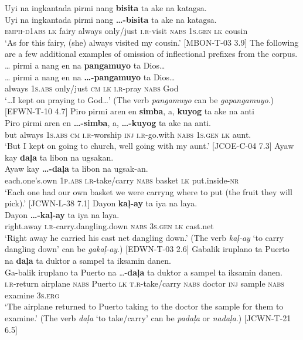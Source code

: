 Uyi  na  ingkantada  pirmi  nang  \textbf{bisita}  ta  ake  na  katagsa. \\\smallskip
 \gll Uyi  na  ingkantada  pirmi  nang  \textbf{…-bisita}  ta  ake  na  katagsa. \\
\textsc{emph}-\textsc{d}1\textsc{abs}  \textsc{lk}  fairy  always  only/just  \textsc{i.r}-visit  \textsc{nabs}  1\textsc{s.gen}  \textsc{lk}  cousin \\
\glt ‘As for this fairy, (she) always visited my cousin.’ [MBON-T-03 3.9]
\z
The following are a few additional examples of omission of inflectional prefixes from the corpus.
\ea
 … pirmi  a  nang  en  na  \textbf{pangamuyo}  ta  Dios… \\\smallskip
 \gll … pirmi  a  nang  en  na  \textbf{…-pangamuyo}  ta  Dios… \\
  {} always  1\textsc{s.abs}  only/just  \textsc{cm}  \textsc{lk}  \textsc{i.r}-pray  \textsc{nabs}  God \\
\glt ‘…I kept on praying to God…’ (The verb \textit{pangamuyo} can be \textit{gapangamuyo}.) [EFWN-T-10 4.7]
\z
\ea
Piro  pirmi  aren  en  \textbf{simba},  a,  \textbf{kuyog}  ta  ake  na  anti \\\smallskip
 \gll Piro  pirmi  aren  en  \textbf{…-simba},  a,  \textbf{…-kuyog}  ta  ake  na  anti. \\
but  always  1\textsc{s.abs}  \textsc{cm}  \textsc{i.r}-worship  \textsc{inj}  \textsc{i.r}-go.with  \textsc{nabs}  1\textsc{s.gen}  \textsc{lk}  aunt. \\
\glt `But I kept on going to church, well going with my aunt.’ [JCOE-C-04 7.3]
\z
\ea
Ayaw  kay  \textbf{daļa}  ta  libon  na  ugsakan. \\\smallskip
 \gll Ayaw  kay  \textbf{…-daļa}  ta  libon  na  ugsak-an. \\
each.one’s.own  1\textsc{p.abs}  \textsc{i.r}-take/carry  \textsc{nabs}  basket  \textsc{lk}  put.inside-\textsc{nr} \\
\glt ‘Each one had our own basket we were carryng where to put (the fruit they will pick).’ [JCWN-L-38 7.1]
\z
\ea
Dayon  \textbf{kaļ-ay}  ta  iya  na  laya. \\\smallskip
 \gll Dayon  \textbf{…-kaļ-ay}  ta  iya  na  laya. \\
right.away  \textsc{i.r}-carry.dangling.down  \textsc{nabs}  3\textsc{s.gen}  \textsc{lk}  cast.net \\
\glt ‘Right away he carried his cast net dangling down.' (The verb \textit{kaļ-ay} ‘to carry dangling down’ can be \textit{gakaļ-ay}.) [EDWN-T-03 2.6]
\z
\ea
Gabalik  iruplano  ta  Puerto   na  \textbf{daļa} ta  duktor    a  sampel ta  iksamin  danen. \\\smallskip
 \gll Ga-balik  iruplano  ta  Puerto   na  …-\textbf{daļa} ta  duktor    a  sampel ta  iksamin  danen. \\
\textsc{i.r}-return  airplane  \textsc{nabs}  Puerto  \textsc{lk}  \textsc{t.r}-take/carry  \textsc{nabs}  doctor    \textsc{inj}  sample
\textsc{nabs}  examine  3\textsc{s.erg} \\
\glt `The airplane returned to Puerto taking to the doctor the sample for them to examine.’ (The verb \textit{daļa} ‘to take/carry’ can be \textit{padaļa} or \textit{nadaļa}.)  [JCWN-T-21 6.5]
\z

